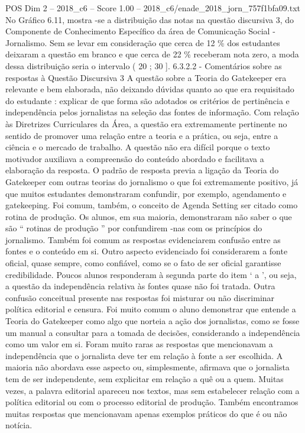 \begin{textsample}{POS Dim 2 – 2018\_c6 – Score 1.00 – 2018\_c6/enade\_2018\_jorn\_757f1bfa09.txt}
No Gráfico 6.11, mostra -se a distribuição das notas na questão discursiva 3, do Componente de Conhecimento Específico da área de Comunicação Social - Jornalismo.
Sem se levar em consideração que cerca de 12 \% dos estudantes deixaram a questão em branco e que cerca de 22 \% receberam nota zero, a moda dessa distribuição seria o intervalo ( 20 ; 30 ]. 6.3.2.2 - Comentários sobre as respostas à Questão Discursiva 3 A questão sobre a Teoria do Gatekeeper era relevante e bem elaborada, não deixando dúvidas quanto ao que era requisitado do estudante : explicar de que forma são adotados os critérios de pertinência e independência pelos jornalistas na seleção das fontes de informação.
Com relação às Diretrizes Curriculares da Área, a questão era extremamente pertinente no sentido de promover uma relação entre a teoria e a prática, ou seja, entre a ciência e o mercado de trabalho.
A questão não era difícil porque o texto motivador auxiliava a compreensão do conteúdo abordado e facilitava a elaboração da resposta.
O padrão de resposta previa a ligação da Teoria do Gatekeeper com outras teorias do jornalismo o que foi extremamente positivo, já que muitos estudantes demonstraram confundir, por exemplo, agendamento e gatekeeping.
Foi comum, também, o conceito de Agenda Setting ser citado como rotina de produção.
Os alunos, em sua maioria, demonstraram não saber o que são “ rotinas de produção ” por confundirem -nas com os princípios do jornalismo.
Também foi comum as respostas evidenciarem confusão entre as fontes e o conteúdo em si.
Outro aspecto evidenciado foi considerarem a fonte oficial, quase sempre, como confiável, como se o fato de ser oficial garantisse credibilidade.
Poucos alunos responderam à segunda parte do item ‘ a ’, ou seja, a questão da independência relativa às fontes quase não foi tratada.
Outra confusão conceitual presente nas respostas foi misturar ou não discriminar política editorial e censura.
Foi muito comum o aluno demonstrar que entende a Teoria do Gatekeeper como algo que norteia a ação dos jornalistas, como se fosse um manual a consultar para a tomada de decisões, considerando a independência como um valor em si.
Foram muito raras as respostas que mencionavam a independência que o jornalista deve ter em relação à fonte a ser escolhida.
A maioria não abordava esse aspecto ou, simplesmente, afirmava que o jornalista tem de ser independente, sem explicitar em relação a quê ou a quem.
Muitas vezes, a palavra editorial apareceu nos textos, mas sem estabelecer relação com a política editorial ou com o processo editorial de produção.
Também encontramos muitas respostas que mencionavam apenas exemplos práticos do que é ou não notícia.

\end{textsample}
